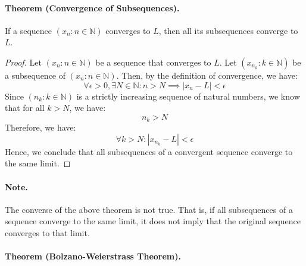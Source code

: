 \documentclass[openany]{book}
\numberwithin{equation}{section}
\begin{document}
\paragraph{Theorem (Convergence of Subsequences).}

    If a sequence $(x_n : n \in \mathbb{N})$ converges to $L$, then all its subsequences converge to $L$.
\par
\begin{proof}
    Let $(x_n : n \in \mathbb{N})$ be a sequence that converges to $L$. Let $(x_{n_k} : k \in \mathbb{N})$ be a subsequence of $(x_n : n \in \mathbb{N})$. Then, by the definition of convergence, we have:
    $$\forall \epsilon > 0, \exists N \in \mathbb{N}: n > N \implies |x_n - L| < \epsilon$$
    Since $(n_k : k \in \mathbb{N})$ is a strictly increasing sequence of natural numbers, we know that for all $k > N$, we have:
    $$n_k > N$$
    Therefore, we have:
    $$\forall k > N: |x_{n_k} - L| < \epsilon$$
    Hence, we conclude that all subsequences of a convergent sequence converge to the same limit.
\end{proof}
\paragraph{Note.}

    The converse of the above theorem is not true. That is, if all subsequences of a sequence converge to the same limit, it does not imply that the original sequence converges to that limit.
\par
\paragraph{Theorem (Bolzano-Weierstrass Theorem).}
\end{document}
